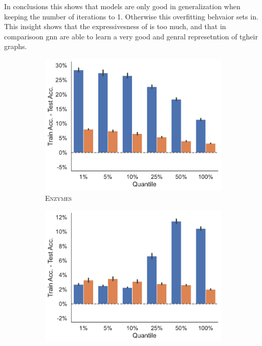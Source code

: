 In conclusions this shows that \wlnn models are only good in generalization when keeping the number of \wl iterations to 1. Otherwise this overfitting behvaior sets in. This insight shows that the expressivesness of \wl is too much, and that in comparisoon gnn are able to learn a very good and genral represetntion of tgheir graphs.

\begin{figure}[!htb]
	\begin{subfigure}[b]{0.3\textwidth}
		\centering
		\includegraphics[width=\textwidth]{Figures/train_test_diff_ENZYMES.pdf}
		\vspace*{-4ex} 
		\caption{\textsc{Enzymes}}
	\end{subfigure}
	\hfill
	\begin{subfigure}[b]{0.3\textwidth}
		\centering
		\includegraphics[width=\textwidth]{Figures/train_test_diff_IMDB-BINARY.pdf}

\end{subfigure}
\end{figure}
